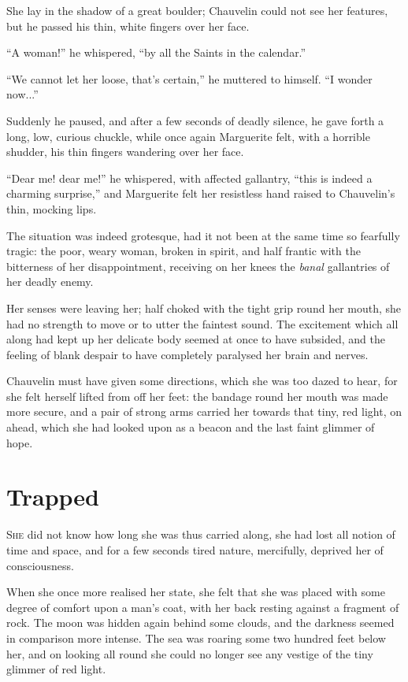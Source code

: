 \documentclass[paper=5.5in:8.5in,BCOR=7mm,twoside,DIV=calc,12pt,usegeometry,chapterprefix,endperiod,headings=big]{scrbook}
\begin{document}
She lay in the shadow of a great boulder; Chauvelin could not see her features, but he passed his thin, white fingers over her face.

\enquote{A woman!} he whispered, \enquote{by all the Saints in the calendar.}

\enquote{We cannot let her loose, that's certain,} he muttered to himself. \enquote{I wonder now...}

Suddenly he paused, and after a few seconds of deadly silence, he gave forth a long, low, curious chuckle, while once again Marguerite felt, with a horrible shudder, his thin fingers wandering over her face.

\enquote{Dear me! dear me!} he whispered, with affected gallantry, \enquote{this is indeed a charming surprise,} and Marguerite felt her resistless hand raised to Chauvelin's thin, mocking lips.

The situation was indeed grotesque, had it not been at the same time so fearfully tragic: the poor, weary woman, broken in spirit, and half frantic with the bitterness of her disappointment, receiving on her knees the \textit{banal} gallantries of her deadly enemy.

Her senses were leaving her; half choked with the tight grip round her mouth, she had no strength to move or to utter the faintest sound. The excitement which all along had kept up her delicate body seemed at once to have subsided, and the feeling of blank despair to have completely paralysed her brain and nerves.

Chauvelin must have given some directions, which she was too dazed to hear, for she felt herself lifted from off her feet: the bandage round her mouth was made more secure, and a pair of strong arms carried her towards that tiny, red light, on ahead, which she had looked upon as a beacon and the last faint glimmer of hope.

\chapter{Trapped}
\lettrine[lines=4]{S}{he} did not know how long she was thus carried along, she had lost all notion of time and space, and for a few seconds tired nature, mercifully, deprived her of consciousness.

When she once more realised her state, she felt that she was placed with some degree of comfort upon a man's coat, with her back resting against a fragment of rock. The moon was hidden again behind some clouds, and the darkness seemed in comparison more intense. The sea was roaring some two hundred feet below her, and on looking all round she could no longer see any vestige of the tiny glimmer of red light.
\end{document}
